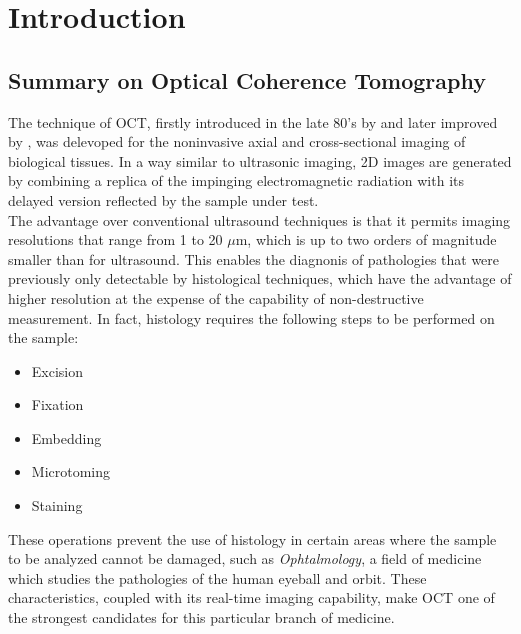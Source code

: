 
\chapter{Introduction} %
\label{ch:introduction} %

\section{Summary on Optical Coherence Tomography}
\label{sec:intro}

The technique of \acf{OCT}, firstly introduced in the late 80's by \citeauthor{Fujimoto1986} \cite{Fujimoto1986} and later improved by \citeauthor{Huang1991} \cite{Huang1991}, was delevoped for the noninvasive axial and cross-sectional imaging of biological tissues.
In a way similar to ultrasonic imaging, 2D images are generated by combining a replica of the impinging electromagnetic radiation with its delayed version reflected by the sample under test.\\



The advantage over conventional ultrasound techniques is that it permits imaging resolutions
that range from 1 to 20 $\mu$m, which is up to two orders of magnitude smaller than for ultrasound. This enables the diagnonis of pathologies that were previously only detectable by histological techniques, which have the advantage of higher resolution at the expense of the capability of non-destructive measurement. In fact, histology requires the following steps to be performed on the sample:
\begin{itemize}
    \item Excision
    \item Fixation
    \item Embedding
    \item Microtoming
    \item Staining
\end{itemize}

These operations prevent the use of histology in certain areas where the sample to be analyzed cannot be damaged, such as \emph{Ophtalmology}, a field of medicine which studies the pathologies of the human eyeball and orbit. These characteristics, coupled with its real-time imaging capability, make \ac{OCT} one of the strongest candidates for this particular branch of medicine. 

